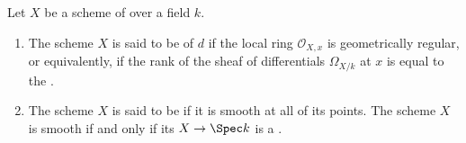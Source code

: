 \begin{definition} \label{definition:smooth_at_a_point_for_a_finite_type_scheme_over_a_field}
Let $X$ be a scheme of  over a field $k$.
\begin{enumerate}
    \item The scheme $X$ is said to be  of  $d$ if the local ring $\mathcal{O}_{X,x}$ is geometrically regular, or equivalently, if the rank of the sheaf of differentials $\Omega_{X/k}$ at $x$ is equal to the .

    \item The scheme $X$ is said to be  if it is smooth at all of its points. The scheme $X$ is smooth if and only if its  $X \to \Spec k$ is a . 
\end{enumerate}

\end{definition}
